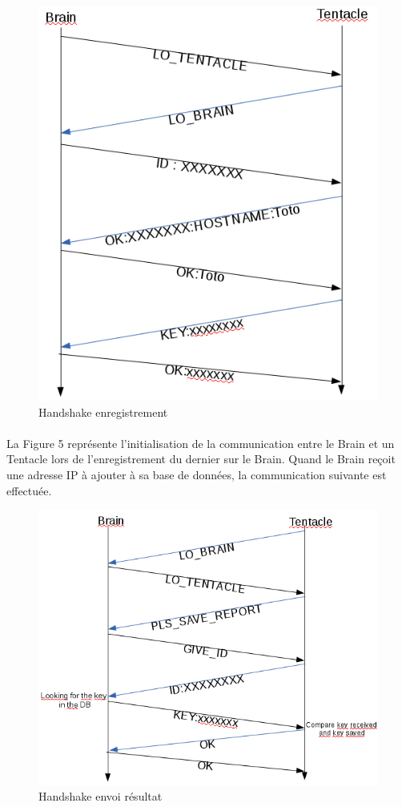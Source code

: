 \begin{figure}[!h]
	\centering
	\includegraphics[scale=0.55]{img/handshake_register_btot.png}
        \caption{Handshake enregistrement}
\end{figure}

\paragraph{}
La Figure 5 représente l'initialisation de la communication entre le Brain et un Tentacle lors de l'enregistrement du dernier sur le Brain. Quand le Brain reçoit une adresse IP à ajouter à sa base de données, la communication suivante est effectuée.

\begin{figure}[!h]
	\centering
	\includegraphics[scale=0.6]{img/handshake_commander_ttob.png}
	\caption{Handshake envoi résultat}
\end{figure}

